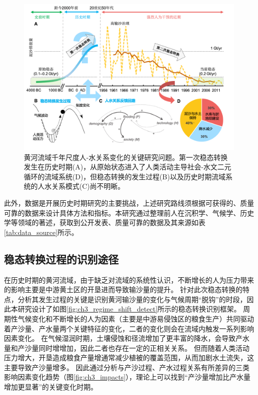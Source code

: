 \begin{figure}[!htb] %
    \centering
    \includegraphics[width=\textwidth]{img/ch3/ch3_why_regime_shift.png}
    \caption[黄河流域千年尺度人-水关系变化的关键研究问题]{黄河流域千年尺度人-水关系变化的关键研究问题。第一次稳态转换发生在历史时期(A)，从原始状态进入了人类活动主导社会-水文二元循环的流域系统(D)，但稳态转换的发生过程(B)以及历史时期流域系统的人水关系模式(C)尚不明晰。}
    \label{fig:ch3_why_regime_shift}
\end{figure}

此外，数据是开展历史时期研究的主要挑战，上述研究路线须根据可获得的、质量可靠的数据来设计具体方法和指标。本研究通过整理前人在沉积学、气候学、历史学等领域的著述，获取到公开发表、质量可靠的数据及其来源如表\ref{tab:data_source}所示。




\subsection{稳态转换过程的识别途径}
\label{sec:ch3:approach}

在历史时期的黄河流域，由于缺乏对流域的系统性认识，不断增长的人为压力带来的影响主要是中游黄土区的开垦进而导致输沙量的提升\cite{wu2020a}。
针对此次稳态转换的特点，分析其发生过程的关键是识别黄河输沙量的变化与气候周期“脱钩”的时段，因此本研究设计了如图\ref{fig:ch3_regime_shift_detect}所示的稳态转换识别框架。
周期性气候变化和不断增长的人为因素（主要是中游易侵蚀区的粮食生产）共同驱动着产沙量、产水量两个关键特征的变化，二者的变化则会在流域内触发一系列影响因素变化。
在气候湿润时期，土壤侵蚀和径流增加了更丰富的降水，会导致产水量和产沙量同时增增加，因此二者也存在一定的正相关关系。
但而随着人类活动压力增大，开垦造成粮食产量增通常减少植被的覆盖范围，从而加剧水土流失，这主要导致产沙量增多。
因此通过分析与产沙过程、产水过程关系有所差异的三类影响因素变化趋势（图\ref{fig:ch3_impacts}），理论上可以找到“产沙量增加比产水量增加更显著”的关键变化时期。

